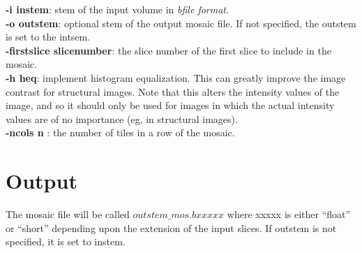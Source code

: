 \documentclass[10pt]{article}
\begin{document}
\noindent
{\bf -i instem}: stem of the input volume in {\em bfile format}. \\ 

\noindent
{\bf -o outstem}: optional stem of the output mosaic file.  If not
specified, the outstem is set to the intsem.\\

\noindent
{\bf -firstslice slicenumber}: the slice number of the first slice to
include in the mosaic. \\

\noindent
{\bf -h heq}: implement histogram equalization.  This can greatly
improve the image contrast for structural images.  Note that this
alters the intensity values of the image, and so it should only be
used for images in which the actual intensity values are of no
importance (eg, in structural images).\\

\noindent
{\bf -ncols n }: the number of tiles in a row of the mosaic.\\

\section{Output}

The mosaic file will be called $outstem\_mos.bxxxxx$ where xxxxx is
either ``float'' or ``short'' depending upon the extension of the
input slices. If outstem is not specified, it is set to instem.
\end{document}
